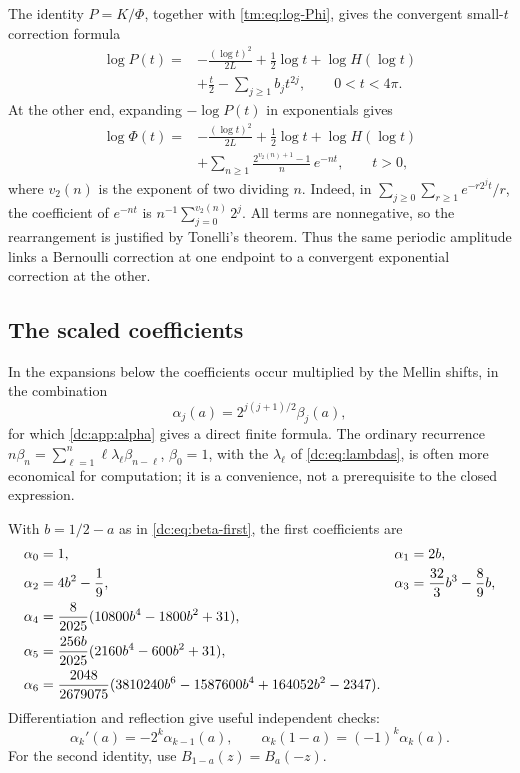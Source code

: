 \documentclass[11pt,a4paper,oneside,openany]{book}
\numberwithin{equation}{chapter}
\theoremstyle{definition}
\theoremstyle{remark}
\newcommand{\W}{K}
\begin{document}
The identity $P=\W/\Phi$, together with \eqref{tm:eq:log-Phi}, gives the convergent
small-$t$ correction formula
\begin{equation}\label{ra:eq:logQexact}
 \begin{split}
 \log P(t)={}&-\frac{(\log t)^2}{2L}+\frac12\log t
       +\log H(\log t)\\
 &+\frac t2-\sum_{j\ge1}b_jt^{2j},\qquad 0<t<4\pi.
 \end{split}
\end{equation}
At the other end, expanding $-\log P(t)$ in exponentials gives
\begin{equation}\label{ra:eq:logHlarge}
 \begin{split}
 \log \Phi(t)={}&-\frac{(\log t)^2}{2L}+\frac12\log t
       +\log H(\log t)\\
 &+\sum_{n\ge1}\frac{2^{v_2(n)+1}-1}{n}\,e^{-nt},\qquad t>0,
 \end{split}
\end{equation}
where $v_2(n)$ is the exponent of two dividing $n$.
Indeed, in $\sum_{j\ge0}\sum_{r\ge1}e^{-r2^jt}/r$, the coefficient of
$e^{-nt}$ is $n^{-1}\sum_{j=0}^{v_2(n)}2^j$.
All terms are nonnegative, so the rearrangement is justified by Tonelli's
theorem. Thus the same periodic amplitude links a Bernoulli correction at
one endpoint to a convergent exponential correction at the other.

\subsection{The scaled coefficients}
In the expansions below the coefficients occur multiplied by the Mellin
shifts, in the combination
\begin{equation}\label{ra:eq:alpha-def}
 \alpha_j(a)=2^{j(j+1)/2}\beta_j(a),
\end{equation}
for which \cref{dc:app:alpha} gives a direct finite formula. The ordinary
recurrence $n\beta_n=\sum_{\ell=1}^n\ell\lambda_\ell\beta_{n-\ell}$, $\beta_0=1$,
with the $\lambda_\ell$ of \eqref{dc:eq:lambdas}, is often more economical
for computation; it is a convenience, not a prerequisite to the closed
expression.

With $b=1/2-a$ as in \eqref{dc:eq:beta-first}, the first coefficients are
\begin{align}
 \alpha_0&=1,& \alpha_1&=2b,\notag\\
 \alpha_2&=4b^2-\frac19,&
 \alpha_3&=\frac{32}{3}b^3-\frac89b,\label{ra:eq:firstcoeff}\\
 \alpha_4&=\frac8{2025}(10800b^4-1800b^2+31),\notag\\
 \alpha_5&=\frac{256b}{2025}(2160b^4-600b^2+31),\notag\\
 \alpha_6&=\frac{2048}{2679075}
       (3810240b^6-1587600b^4+164052b^2-2347).\notag
\end{align}
Differentiation and reflection give useful independent checks:
\begin{equation}\label{ra:eq:coeffchecks}
 \alpha_k'(a)=-2^k \alpha_{k-1}(a),\qquad
 \alpha_k(1-a)=(-1)^k \alpha_k(a).
\end{equation}
For the second identity, use $B_{1-a}(z)=B_a(-z)$.
\end{document}
